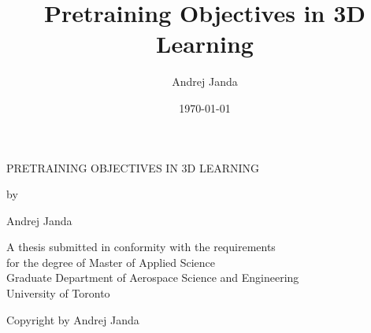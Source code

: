 \documentclass[12pt]{book}
\title{Pretraining Objectives in 3D Learning}
\author{Andrej Janda}
\date{\today}
\begin{document}

\begin{titlepage}
    \begin{center}
        \large
        \vspace*{2cm}

        PRETRAINING OBJECTIVES IN 3D LEARNING

        \vspace{2.5cm}

        by

        \vspace{2.5cm}

        Andrej Janda

        \vspace{5.25cm}


        A thesis submitted in conformity with the requirements \\
        for the degree of Master of Applied Science \\
        Graduate Department of Aerospace Science and Engineering \\
        University of Toronto

        \vspace{2.5cm}


        \textcopyright \hspace{0.25em} Copyright by Andrej Janda


    \end{center}
\end{titlepage}
\end{document}
